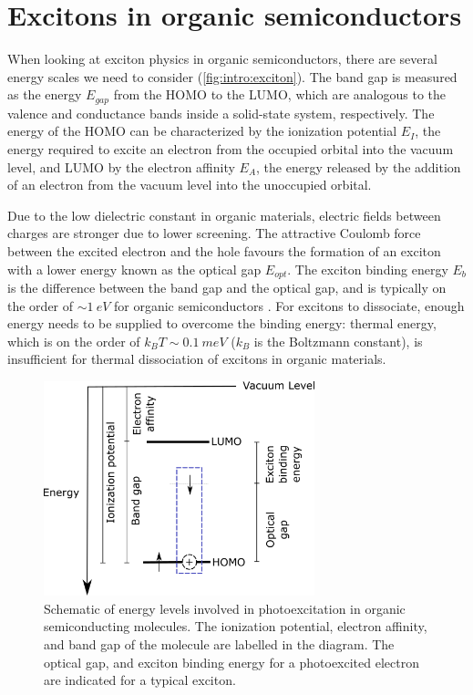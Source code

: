 \section{Excitons in organic semiconductors}

When looking at exciton physics in organic semiconductors, there are several energy scales we need to consider (\autoref{fig:intro:exciton}). The band gap is measured as the energy $E_{gap}$ from the \ac{HOMO} to the \ac{LUMO}, which are analogous to the valence and conductance bands inside a solid-state system, respectively. The energy of the \ac{HOMO} can be characterized by the ionization potential $E_I$, the energy required to excite an electron from the occupied orbital into the vacuum level, and \ac{LUMO} by the electron affinity $E_A$, the energy released by the addition of an electron from the vacuum level into the unoccupied orbital.

Due to the low dielectric constant in organic materials, electric fields between charges are stronger due to lower screening. The attractive Coulomb force between the excited electron and the hole favours the formation of an exciton with a lower energy known as the optical gap $E_{opt}$. The exciton binding energy $E_b$ is the difference between the band gap and the optical gap, and is typically on the order of $\sim \SI{1}{eV}$ for organic semiconductors \citep{knupfer2003exciton}. For excitons to dissociate, enough energy needs to be supplied to overcome the binding energy: thermal energy, which is on the order of $k_B T \sim \SI{0.1}{meV}$ ($k_B$ is the Boltzmann constant), is insufficient for thermal dissociation of excitons in organic materials.

\begin{figure}[h]
    \centering
    \includegraphics[width=0.7\textwidth]{pictures/exciton_energy.png}
    \caption{Schematic of energy levels involved in photoexcitation in organic semiconducting molecules. The ionization potential, electron affinity, and band gap of the molecule are labelled in the diagram. The optical gap, and exciton binding energy for a photoexcited electron are indicated for a typical exciton.}
    \label{fig:intro:exciton}
\end{figure}

